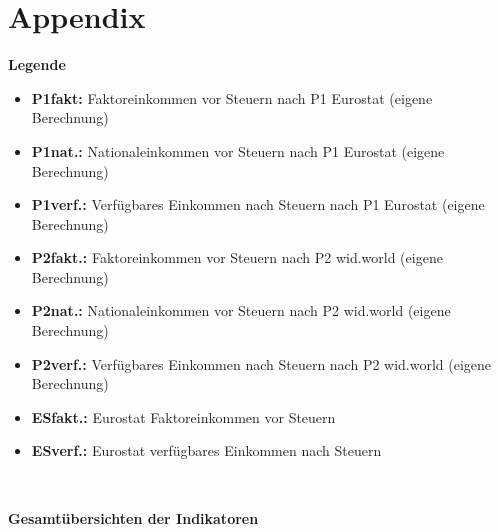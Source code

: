 \documentclass[12pt,]{article}
\providecommand{\tightlist}{%
  \setlength{\itemsep}{0pt}\setlength{\parskip}{0pt}}
\begin{document}
\section{Appendix}\label{appendix}

\textbf{Legende}

\begin{itemize}
\tightlist
\item
  \textbf{P1fakt:} Faktoreinkommen vor Steuern nach P1 Eurostat (eigene
  Berechnung)
\item
  \textbf{P1nat.:} Nationaleinkommen vor Steuern nach P1 Eurostat
  (eigene Berechnung)
\item
  \textbf{P1verf.:} Verfügbares Einkommen nach Steuern nach P1 Eurostat
  (eigene Berechnung)
\item
  \textbf{P2fakt.:} Faktoreinkommen vor Steuern nach P2 wid.world
  (eigene Berechnung)
\item
  \textbf{P2nat.:} Nationaleinkommen vor Steuern nach P2 wid.world
  (eigene Berechnung)
\item
  \textbf{P2verf.:} Verfügbares Einkommen nach Steuern nach P2 wid.world
  (eigene Berechnung)
\item
  \textbf{ESfakt.:} Eurostat Faktoreinkommen vor Steuern
\item
  \textbf{ESverf.:} Eurostat verfügbares Einkommen nach Steuern
\end{itemize}

~

\textbf{Gesamtübersichten der Indikatoren}
\end{document}
